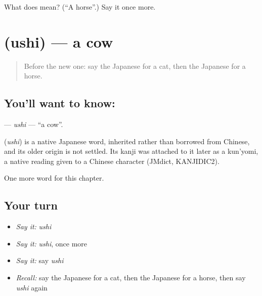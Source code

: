 \begin{tcolorbox}[breakable,colback=teal!4,colframe=teal!35!black,title={Before you move on}]
What does  mean? (\textquotedblleft{}A horse\textquotedblright{}.) Say it once more.
\end{tcolorbox}
\section[\texorpdfstring{\ja{うし} (ushi)}{うし (ushi)}]{ (ushi) — a cow}

\label{lesson:JA-C45-ushi}



\begin{quote}
Before the new one: say the Japanese for a cat, then the Japanese for a horse.
\end{quote}

\subsection*{You'll want to know: }
\textbf{} — \emph{ushi} — \textquotedblleft{}a cow\textquotedblright{}.

\begin{cousinweb}
\textbf{} (\emph{ushi}) is a native Japanese word, inherited rather than borrowed from Chinese, and its older origin is not settled. Its kanji was attached to it later as a kun'yomi, a native reading given to a Chinese character (JMdict, KANJIDIC2).
\end{cousinweb}

\begin{grammarlens}[title={What you've built}]
One more word for this chapter.
\end{grammarlens}

\subsection*{Your turn}
\begin{itemize}
\raggedright
  \item \emph{Say it:} \emph{ushi}
  \item \emph{Say it:} \emph{ushi}, once more
  \item \emph{Say it:} say \emph{ushi}
  \item \emph{Recall:} say the Japanese for a cat, then the Japanese for a horse, then say \emph{ushi} again
\end{itemize}

